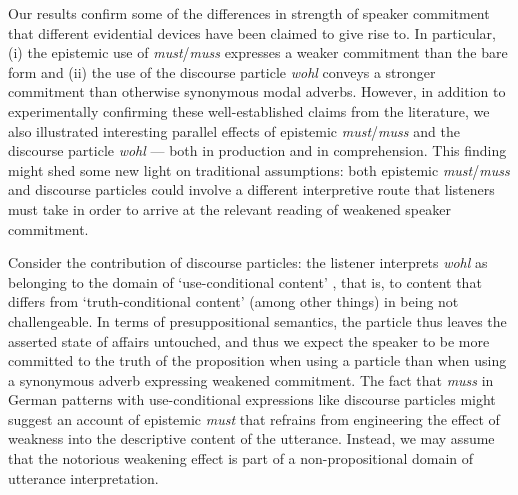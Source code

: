 \documentclass[11pt]{article}
\begin{document}
Our results confirm some of the differences in strength of speaker commitment that different evidential devices have been claimed to give rise to. In particular, (i) the epistemic use of \emph{must}/\emph{muss} expresses a weaker commitment than the bare form and (ii) the use of the discourse particle \emph{wohl} conveys a stronger commitment than otherwise synonymous modal adverbs. However, in addition to experimentally confirming these well-established claims from the literature, we also illustrated interesting parallel effects of epistemic \emph{must}/\emph{muss} and the discourse particle \emph{wohl} — both in production and in comprehension. This finding might shed some new light on traditional assumptions: both epistemic  \emph{must}/\emph{muss} and discourse particles could involve a different interpretive route that listeners must take in order to arrive at the relevant reading of weakened speaker commitment. %

Consider the contribution of discourse particles: the listener interprets \emph{wohl} as belonging to the domain of ‘use-conditional content’ \citep{Recanati2004}, that is, to content that differs from ‘truth-conditional content’ (among other things) in being not challengeable. In terms of presuppositional semantics, the particle thus leaves the asserted state of affairs untouched, and thus we expect the speaker to be more committed to the truth of the proposition when using a particle than when using a synonymous adverb expressing weakened commitment. %
The fact that \emph{muss} in German patterns with use-conditional expressions like discourse particles might suggest an account of epistemic \emph{must} that refrains from engineering the effect of weakness into the descriptive content of the utterance. Instead, we may assume that the notorious weakening effect is part of a non-propositional domain of utterance interpretation. 
\end{document}
